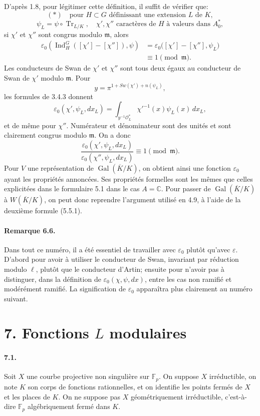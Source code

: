 \documentclass[10pt,letterpaper]{article}
\newcommand{\C}{\mathbb C}
\newcommand{\F}{\mathbb F}
\newcommand{\Gal}{\operatorname{Gal}}
\newcommand{\Ind}{\operatorname{Ind}}
\newcommand{\Tr}{\operatorname{Tr}}
\providecommand{\Gal}{\operatorname{Gal}}
\providecommand{\Gal}{\operatorname{Gal}}
\providecommand{\Tr}{\operatorname{Tr}}
\providecommand{\Gal}{\operatorname{Gal}}
\providecommand{\Tr}{\operatorname{Tr}}
\providecommand{\Gal}{\operatorname{Gal}}
\providecommand{\Tr}{\operatorname{Tr}}
\providecommand{\Ind}{\operatorname{Ind}}
\begin{document}
D'après 1.8, pour légitimer cette définition, il suffit de vérifier que:
\[
(*)\quad
\text{pour }H\subset G\text{ définissant une extension }L\text{ de }K,
\]
\[
\psi_L=\psi\circ\Tr_{L/K},\quad
\chi',\chi''\text{ caractères de }H\text{ à valeurs dans }A_0^*,
\]
si \(\chi'\) et \(\chi''\) sont congrus modulo \(\mathfrak m\), alors
\[
\begin{aligned}
\varepsilon_0\!\left(\Ind_H^G([\chi']-[\chi'']),\psi\right)
&=\varepsilon_0\bigl([\chi']-[\chi''],\psi_L\bigr)\\
&\equiv1\pmod{\mathfrak m}.
\end{aligned}
\]
Les conducteurs de Swan de \(\chi'\) et \(\chi''\) sont tous deux égaux au conducteur de Swan de \(\chi'\) modulo \(\mathfrak m\). Pour
\[
y=\pi^{1+Sw(\chi')+n(\psi_L)},
\]
les formules de 3.4.3 donnent
\[
\varepsilon_0(\chi',\psi_L,dx_L)=
\int_{y^{-1}\mathcal O_L^*}\chi'^{-1}(x)\psi_L(x)\,dx_L,
\]
et de même pour \(\chi''\). Numérateur et dénominateur sont des unités et sont clairement congrus modulo \(\mathfrak m\). On a donc
\[
\frac{\varepsilon_0(\chi',\psi_L,dx_L)}
{\varepsilon_0(\chi'',\psi_L,dx_L)}
\equiv1\pmod{\mathfrak m}.
\]
Pour \(V\) une représentation de \(\Gal(\overline K/K)\), on obtient ainsi une fonction \(\varepsilon_0\) ayant les propriétés annoncées. Ses propriétés formelles sont les mêmes que celles explicitées dans le formulaire 5.1 dans le cas \(A=\C\). Pour passer de \(\Gal(\overline K/K)\) à \(W(\overline K/K)\), on peut donc reprendre l'argument utilisé en 4.9, à l'aide de la deuxième formule (5.5.1).

\paragraph{Remarque 6.6.} Dans tout ce numéro, il a été essentiel de travailler avec \(\varepsilon_0\) plutôt qu'avec \(\varepsilon\). D'abord pour avoir à utiliser le conducteur de Swan, invariant par réduction modulo \(\ell\), plutôt que le conducteur d'Artin; ensuite pour n'avoir pas à distinguer, dans la définition de \(\varepsilon_0(\chi,\psi,dx)\), entre les cas non ramifié et modérément ramifié. La signification de \(\varepsilon_0\) apparaîtra plus clairement au numéro suivant.

\section*{7. Fonctions \(L\) modulaires}

\paragraph{7.1.} Soit \(X\) une courbe projective non singulière sur \(\F_p\). On suppose \(X\) irréductible, on note \(K\) son corps de fonctions rationnelles, et on identifie les points fermés de \(X\) et les places de \(K\). On ne suppose pas \(X\) géométriquement irréductible, c'est-à-dire \(\F_p\) algébriquement fermé dans \(K\).
\end{document}
